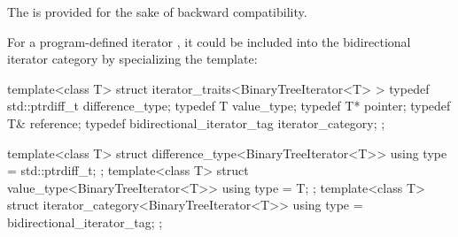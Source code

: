 \begin{addedblock}
\pnum
\enternote
The  is provided for the sake of backward compatibility.
\exitnote
\end{addedblock}

\pnum
{}%
%
%
%
%
%
\enterexample
For a program-defined iterator
,
it could be included
into the bidirectional iterator category by specializing the
\added{, }
 template:

\begin{removedblock}
\begin{codeblock}
template<class T> struct iterator_traits<BinaryTreeIterator<T> > {
  typedef std::ptrdiff_t difference_type;
  typedef T value_type;
  typedef T* pointer;
  typedef T& reference;
  typedef bidirectional_iterator_tag iterator_category;
};
\end{codeblock}
\end{removedblock}
\begin{addedblock}
\begin{codeblock}
template<class T> struct difference_type<BinaryTreeIterator<T>> {
  using type = std::ptrdiff_t;
};
template<class T> struct value_type<BinaryTreeIterator<T>> {
  using type = T;
};
template<class T> struct iterator_category<BinaryTreeIterator<T>> {
  using type = bidirectional_iterator_tag;
};
\end{codeblock}
\end{addedblock}

\exitexample

